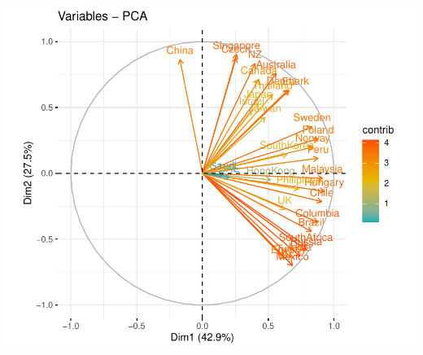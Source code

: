 \documentclass[11pt,preprint, authoryear]{elsarticle}
\numberwithin{equation}{section}
\numberwithin{figure}{section}
\numberwithin{table}{section}
\begin{document}
\includegraphics{Essay_files/figure-latex/unnamed-chunk-3-7.pdf}
\end{document}
